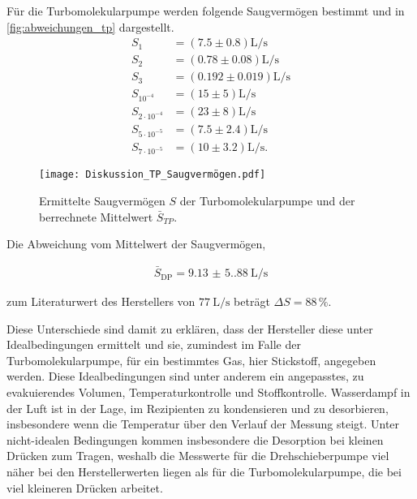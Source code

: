 Für die Turbomolekularpumpe werden folgende Saugvermögen bestimmt und in \autoref{fig:abweichungen_tp} dargestellt. 
\begin{align*}
    S_1 &= (\num{7.5} \pm \num{0.8}) \si{\liter\per\second} \\
    S_2 &= (\num{0.78} \pm \num{0.08}) \si{\liter\per\second} \\
    S_3 &= (\num{0.192} \pm \num{0.019}) \si{\liter\per\second} \\
    S_{10^{-4}} &= (\num{15} \pm \num{5}) \si{\liter\per\second} \\
    S_{2 \cdot 10^{-4}} &= (\num{23} \pm \num{8}) \si{\liter\per\second} \\
    S_{5 \cdot 10^{-5}} &= (\num{7.5} \pm \num{2.4}) \si{\liter\per\second}\\
    S_{7 \cdot 10^{-5}} &= (\num{10} \pm \num{3.2}) \si{\liter\per\second}.
\end{align*}

\begin{figure}[H]
    \centering
    \texttt{[image: Diskussion\_TP\_Saugvermögen.pdf]}
    \caption{Ermittelte Saugvermögen $S$ der Turbomolekularpumpe und der berrechnete Mittelwert $\bar{S}_{TP}$.}
    \label{fig:abweichungen_tp}
\end{figure}

Die Abweichung vom Mittelwert der Saugvermögen,

\begin{align*}
    \bar{S}_{\text{DP}} = \qty{9.13(5.88)}{\liter\per\second}
\end{align*}

zum Literaturwert des Herstellers von $\SI{77}{\liter\per\second}$ \cite{delta_tu_dortmund} beträgt $\Delta S = \num{88} \, \%$.

Diese Unterschiede sind damit zu erklären, dass der Hersteller diese unter Idealbedingungen ermittelt und sie, zumindest im Falle der Turbomolekularpumpe,
für ein bestimmtes Gas, hier Stickstoff, angegeben werden. Diese Idealbedingungen sind unter anderem ein angepasstes, zu evakuierendes Volumen, Temperaturkontrolle und Stoffkontrolle.
Wasserdampf in der Luft ist in der Lage, im Rezipienten zu kondensieren und zu desorbieren, insbesondere wenn die Temperatur über den Verlauf der Messung steigt.
Unter nicht-idealen Bedingungen kommen insbesondere die Desorption bei kleinen Drücken zum Tragen, weshalb die Messwerte für die Drehschieberpumpe viel näher bei den Herstellerwerten liegen als für
die Turbomolekularpumpe, die bei viel kleineren Drücken arbeitet. 

